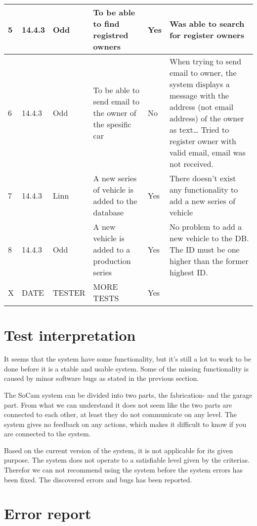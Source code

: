 \begin{center}
\begin{longtable}{| l | l | l | p{3cm}  | l | p{5cm} |}
	    5 & 14.4.3 & Odd & To be able to find registred owners & Yes &  Was able to search for register owners\\ \hline
	    6 & 14.4.3 & Odd & To be able to send email to the owner of the spesific car & No & When trying to send email to owner, the system displays a message with the address (not email address) of the owner as text… Tried to register owner with valid email, email was not received. \\ \hline
	    7 & 14.4.3 & Linn & A new series of vehicle is added to the database & Yes & There doesn't exist any functionality to add a new series of vehicle \\ \hline
	    8 & 14.4.3 & Odd & A new vehicle is added to a production series & Yes & No problem to add a new vehicle to the DB. The ID must be one higher than the former highest ID. \\ \hline
	    X & DATE & TESTER & MORE TESTS & Yes &  \\ \hline

	    \hline
	    \end{longtable}
	\end{center}

	\section{Test interpretation}

		It seems that the system have some functionality, but it’s still a lot to work to be done before it is a stable and usable system. Some of the missing functionality is caused by minor software bugs as stated in the previous section.

		The SoCam system can be divided into two parts, the fabrication- and the garage part. From what we can understand it does not seem like the two parts are connected to each other, at least they do not communicate on any level.  The system gives no feedback on any actions, which makes it difficult to know if you are connected to the system. 

		Based on the current version of the system, it is not applicable for its given purpose. The system does not operate to a satisfiable level given by the criterias. Therefor we can not recommend using the system before the system errors has been fixed. The discovered errors and bugs has been reported. 

	\section{Error report}

